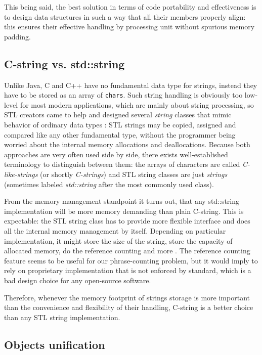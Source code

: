 This being said, the best solution in terms of code portability and effectiveness
is to design data structures in such a way that all their members properly align:
this ensures their effective handling by processing unit without spurious memory padding.

\subsection{C-string vs. std::string}
\label{sec:strings}

Unlike Java, C and C++ have no fundamental data type for strings, instead they have
to be stored as an array of \texttt{chars}.
Such string handling is obviously too low-level for most modern applications,
which are mainly about string processing, so STL creators came to help and designed
several \emph{string} classes that mimic behavior of ordinary data types
\citep[Chapter 11]{josuttis:stl}:
STL strings may be copied, assigned and compared like any other fundamental type,
without the programmer being worried about the internal memory allocations and deallocations.
Because both approaches are very often used side by side, there exists well-established
terminology to distinguish between them:
the arrays of characters are called \emph{C-like-strings} (or shortly \emph{C-strings}) and
STL string classes are just \emph{strings} (sometimes labeled \emph{std::string} after the
most commonly used class).

From the memory management standpoint it turns out, that any std::string
implementation will be more memory demanding than plain C-string.
This is expectable: the STL string class has to provide more flexible interface
and does all the internal memory management by itself.
Depending on particular implementation, it might store the size of the string,
store the capacity of allocated memory, do the reference counting and more
\citep[Item 15]{meyers:effectivestl}.
The reference counting feature seems to be useful for our phrase-counting problem,
but it would imply to rely on proprietary implementation that is not enforced by
standard, which is a bad design choice for any open-source software.

Therefore, whenever the memory footprint of strings storage is more important than
the convenience and flexibility of their handling, C-string is a better choice
than any STL string implementation.

\subsection{Objects unification}
\label{sec:objects-unification}

